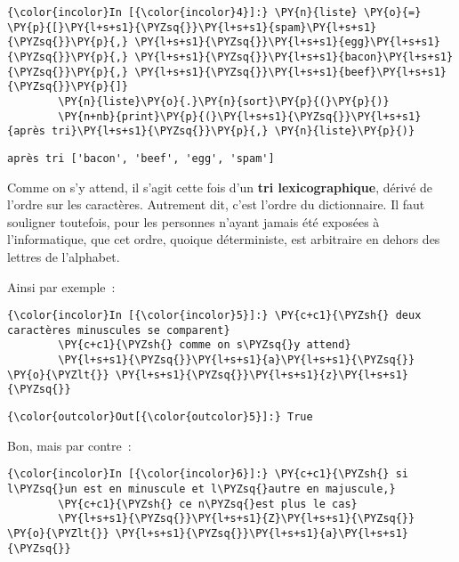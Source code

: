    \begin{Verbatim}[commandchars=\\\{\},frame=single,framerule=0.3mm,rulecolor=\color{cellframecolor}]
{\color{incolor}In [{\color{incolor}4}]:} \PY{n}{liste} \PY{o}{=} \PY{p}{[}\PY{l+s+s1}{\PYZsq{}}\PY{l+s+s1}{spam}\PY{l+s+s1}{\PYZsq{}}\PY{p}{,} \PY{l+s+s1}{\PYZsq{}}\PY{l+s+s1}{egg}\PY{l+s+s1}{\PYZsq{}}\PY{p}{,} \PY{l+s+s1}{\PYZsq{}}\PY{l+s+s1}{bacon}\PY{l+s+s1}{\PYZsq{}}\PY{p}{,} \PY{l+s+s1}{\PYZsq{}}\PY{l+s+s1}{beef}\PY{l+s+s1}{\PYZsq{}}\PY{p}{]}
        \PY{n}{liste}\PY{o}{.}\PY{n}{sort}\PY{p}{(}\PY{p}{)}
        \PY{n+nb}{print}\PY{p}{(}\PY{l+s+s1}{\PYZsq{}}\PY{l+s+s1}{après tri}\PY{l+s+s1}{\PYZsq{}}\PY{p}{,} \PY{n}{liste}\PY{p}{)}
\end{Verbatim}


    \begin{Verbatim}[commandchars=\\\{\},frame=single,framerule=0.3mm,rulecolor=\color{cellframecolor}]
après tri ['bacon', 'beef', 'egg', 'spam']
\end{Verbatim}

    Comme on s'y attend, il s'agit cette fois d'un \textbf{tri
lexicographique}, dérivé de l'ordre sur les caractères. Autrement dit,
c'est l'ordre du dictionnaire. Il faut souligner toutefois, pour les
personnes n'ayant jamais été exposées à l'informatique, que cet ordre,
quoique déterministe, est arbitraire en dehors des lettres de
l'alphabet.

    Ainsi par exemple~:

    \begin{Verbatim}[commandchars=\\\{\},frame=single,framerule=0.3mm,rulecolor=\color{cellframecolor}]
{\color{incolor}In [{\color{incolor}5}]:} \PY{c+c1}{\PYZsh{} deux caractères minuscules se comparent}
        \PY{c+c1}{\PYZsh{} comme on s\PYZsq{}y attend}
        \PY{l+s+s1}{\PYZsq{}}\PY{l+s+s1}{a}\PY{l+s+s1}{\PYZsq{}} \PY{o}{\PYZlt{}} \PY{l+s+s1}{\PYZsq{}}\PY{l+s+s1}{z}\PY{l+s+s1}{\PYZsq{}}
\end{Verbatim}


\begin{Verbatim}[commandchars=\\\{\},frame=single,framerule=0.3mm,rulecolor=\color{cellframecolor}]
{\color{outcolor}Out[{\color{outcolor}5}]:} True
\end{Verbatim}
            
    Bon, mais par contre~:

    \begin{Verbatim}[commandchars=\\\{\},frame=single,framerule=0.3mm,rulecolor=\color{cellframecolor}]
{\color{incolor}In [{\color{incolor}6}]:} \PY{c+c1}{\PYZsh{} si l\PYZsq{}un est en minuscule et l\PYZsq{}autre en majuscule,}
        \PY{c+c1}{\PYZsh{} ce n\PYZsq{}est plus le cas}
        \PY{l+s+s1}{\PYZsq{}}\PY{l+s+s1}{Z}\PY{l+s+s1}{\PYZsq{}} \PY{o}{\PYZlt{}} \PY{l+s+s1}{\PYZsq{}}\PY{l+s+s1}{a}\PY{l+s+s1}{\PYZsq{}}
\end{Verbatim}


